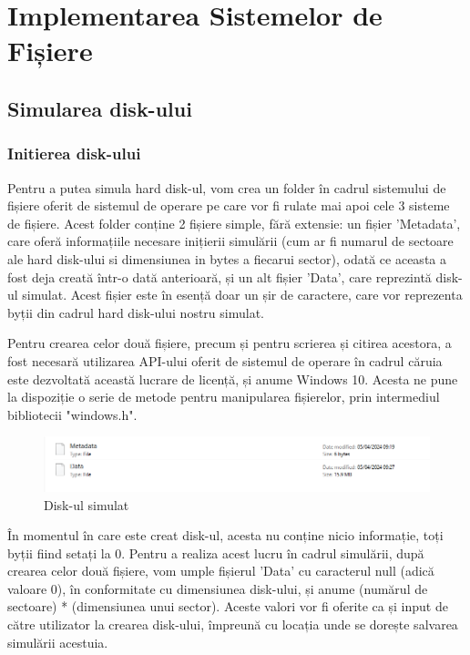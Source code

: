 \chapter{Implementarea Sistemelor de Fișiere}

\section{Simularea disk-ului}

\subsection{Initierea disk-ului}

Pentru a putea simula hard disk-ul, vom crea un folder în cadrul sistemului de fișiere oferit de sistemul de operare pe care vor fi rulate mai apoi cele 3 sisteme de fișiere. Acest folder conține 2 fișiere simple, fără extensie: un fișier 'Metadata', care oferă informațiile necesare inițierii simulării (cum ar fi numarul de sectoare ale hard disk-ului si dimensiunea in bytes a fiecarui sector), odată ce aceasta a fost deja creată într-o dată anterioară, și un alt fișier 'Data', care reprezintă disk-ul simulat. Acest fișier este în esență doar un șir de caractere, care vor reprezenta byții din cadrul hard disk-ului nostru simulat.

Pentru crearea celor două fișiere, precum și pentru scrierea și citirea acestora, a fost necesară utilizarea API-ului oferit de sistemul de operare în cadrul căruia este dezvoltată această lucrare de licență, și anume Windows 10. Acesta ne pune la dispoziție o serie de metode pentru manipularea fișierelor, prin intermediul bibliotecii "windows.h".

\bigskip

\begin{figure}[h]
    \centering
    \includegraphics[width=1.0\linewidth]{images/2.1.png}
    \caption{Disk-ul simulat}
    \label{fig:enter-label}
\end{figure}

În momentul în care este creat disk-ul, acesta nu conține nicio informație, toți byții fiind setați la 0. Pentru a realiza acest lucru în cadrul simulării, după crearea celor două fișiere, vom umple fișierul 'Data' cu caracterul null (adică valoare 0), în conformitate cu dimensiunea disk-ului, și anume (numărul de sectoare) * (dimensiunea unui sector). Aceste valori vor fi oferite ca și input de către utilizator la crearea disk-ului, împreună cu locația unde se dorește salvarea simulării acestuia.


